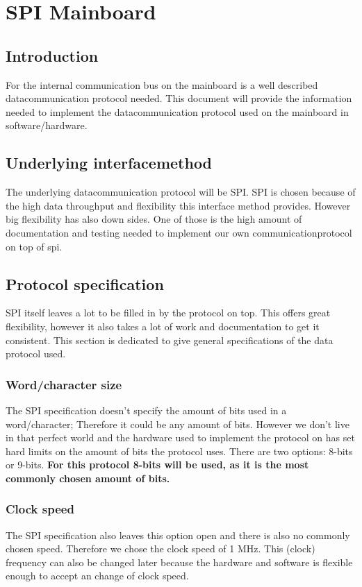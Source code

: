 \chapter{SPI Mainboard}
\section{Introduction}
For the internal communication bus on the mainboard is a well described datacommunication protocol needed. This document will provide the information needed to implement the datacommunication protocol used on the mainboard in software/hardware.
\section{Underlying interfacemethod}
The underlying datacommunication protocol will be SPI. SPI is chosen because of the high data throughput and flexibility this interface method provides. However big flexibility has also down sides. One of those is the high amount of documentation and testing needed to implement our own communicationprotocol on top of spi. 
\section{Protocol specification}
SPI itself leaves a lot to be filled in by the protocol on top. This offers great flexibility, however it also takes a lot of work and documentation to get it consistent. This section is dedicated to give general specifications of the data protocol used.
\subsection{Word/character size}
The SPI specification doesn't specify the amount of bits used in a word/character; Therefore it could be any amount of bits. However we don't live in that perfect world and the hardware used to implement the protocol on has set hard limits on the amount of bits the protocol uses.
There are two options: 8-bits or 9-bits. \textbf{For this protocol 8-bits will be used, as it is the most commonly chosen amount of bits. }
\subsection{Clock speed}
The SPI specification also leaves this option open and there is also no commonly chosen speed. Therefore we chose the clock speed of 1 MHz. This (clock) frequency can also be changed later because the hardware and software is flexible enough to accept an change of clock speed.
